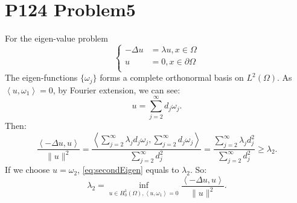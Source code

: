 \documentclass[a4paper]{ctexart}
\newcommand{\innerprod}[2]{\left<#1,#2\right>}
\begin{document}
\section*{P124 Problem5}
For the eigen-value problem 
\begin{equation}
    \left\{
        \begin{aligned}
            -\Delta u&=\lambda u,x\in\Omega\\
            u&=0,x\in\partial\Omega\\
        \end{aligned}
    \right.
\end{equation}
The eigen-functions $\{\omega_{j}\}$ forms a complete orthonormal basis on $L^{2}(\Omega)$. As $\innerprod{u}{\omega_{1}}=0$, by Fourier extension, we can see:
\begin{equation}
    \label{eq:FourierExtend}
    u=\sum_{j=2}^{\infty}d_{j}\omega_{j}.
\end{equation}
Then:
\begin{equation}
    \label{eq:secondEigen}
    \frac{\innerprod{-\Delta u}{u}}{\|u\|^2}=\frac{\innerprod{\sum_{j=2}^{\infty}\lambda_{j}d_{j}\omega_{j}}{\sum_{j=2}^{\infty}d_{j}\omega_{j}}}{\sum_{j=2}^{\infty}d_{j}^{2}}=\frac{\sum_{j=2}^{\infty}\lambda_{j}d_{j}^{2}}{\sum_{j=2}^{\infty}d_{j}^{2}}\ge\lambda_{2}.
\end{equation}
If we choose $u=\omega_{2}$, \eqref{eq:secondEigen} equals to $\lambda_{2}$. So:
\begin{equation}
    \lambda_{2}=\inf_{u\in H_{0}^{1}(\Omega),\innerprod{u}{\omega_{1}}=0}\frac{\innerprod{-\Delta u}{u}}{\|u\|^{2}}.
\end{equation}
\end{document}
